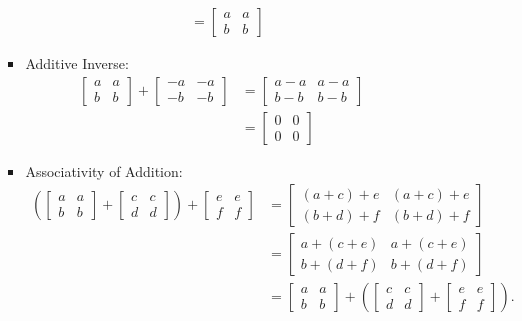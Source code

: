 \documentclass[11pt]{article}
\begin{document}
\begin{enumerate}
\begin{enumerate}
\begin{description}
\begin{itemize}
\begin{align*}
                   &= \begin{bmatrix}a&a\\b&b\end{bmatrix}
          \end{align*}
        \item Additive Inverse:
          \begin{align*}
            \begin{bmatrix}a&a\\b&b\end{bmatrix} + \begin{bmatrix}-a&-a \\ -b&-b\end{bmatrix} &= \begin{bmatrix}a-a&a-a\\b-b&b-b\end{bmatrix}\\
                            &= \begin{bmatrix}0&0\\0&0\end{bmatrix}
          \end{align*}
        \item Associativity of Addition:
          \begin{align*}
            \left(\begin{bmatrix}a&a\\b&b\end{bmatrix} + \begin{bmatrix}c&c\\d&d\end{bmatrix}\right) + \begin{bmatrix}e&e\\f&f\end{bmatrix} &= \begin{bmatrix}(a+c)+e & (a+c)+e\\(b+d)+f & (b+d)+f\end{bmatrix}\\
                                  &= \begin{bmatrix}a+(c+e) & a+(c+e)\\b+(d+f) & b+(d+f)\end{bmatrix}\\
                                  &= \begin{bmatrix}a&a\\b&b\end{bmatrix} + \left( \begin{bmatrix}c&c\\d&d\end{bmatrix} + \begin{bmatrix}e&e\\f&f\end{bmatrix}\right).

\end{align*}
\end{itemize}
\end{description}
\end{enumerate}
\end{enumerate}
\end{document}
